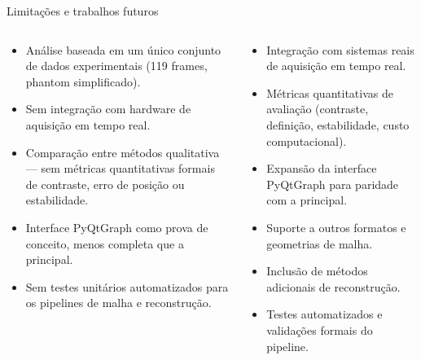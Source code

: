 \documentclass[aspectratio=169]{beamer}
\begin{document}
\begin{frame}{Limitações e trabalhos futuros}
\vspace{-0.4em}
\begin{columns}[T,totalwidth=\textwidth]
\begin{tcolorbox}[ufabcbox,title=Escopo atual do trabalho]
\scriptsize
\begin{itemize}\setlength{\itemsep}{1pt}\setlength{\parskip}{0pt}\setlength{\topsep}{1pt}
  \item Análise baseada em um único conjunto de dados experimentais (119 frames, phantom simplificado).
  \item Sem integração com hardware de aquisição em tempo real.
  \item Comparação entre métodos qualitativa --- sem métricas quantitativas formais de contraste, erro de posição ou estabilidade.
  \item Interface PyQtGraph como prova de conceito, menos completa que a principal.
  \item Sem testes unitários automatizados para os pipelines de malha e reconstrução.
\end{itemize}
\end{tcolorbox}

\begin{tcolorbox}[ufabcnote,title=Continuidade natural]
\scriptsize
\begin{itemize}\setlength{\itemsep}{1pt}\setlength{\parskip}{0pt}\setlength{\topsep}{1pt}
  \item Integração com sistemas reais de aquisição em tempo real.
  \item Métricas quantitativas de avaliação (contraste, definição, estabilidade, custo computacional).
  \item Expansão da interface PyQtGraph para paridade com a principal.
  \item Suporte a outros formatos e geometrias de malha.
  \item Inclusão de métodos adicionais de reconstrução.
  \item Testes automatizados e validações formais do pipeline.
\end{itemize}
\end{tcolorbox}
\end{columns}

\end{frame}
\end{document}
